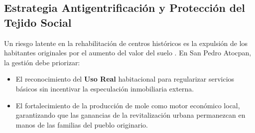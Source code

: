 \subsection{Estrategia Antigentrificación y Protección del Tejido Social}
\label{ssec:estrategia-proteccion-tejido-social}

Un riesgo latente en la rehabilitación de centros históricos es la expulsión 
de los habitantes originales por el aumento del valor 
del suelo \cite{balandrano2016conservacion}. En San Pedro Atocpan, 
la gestión debe priorizar:

\begin{itemize}
    \item El reconocimiento del \textbf{Uso Real} habitacional para 
            regularizar servicios básicos sin incentivar la especulación 
            inmobiliaria externa.
    \item El fortalecimiento de la producción de mole como motor económico 
            local, garantizando que las ganancias de la revitalización urbana 
            permanezcan en manos de las familias del pueblo originario.
\end{itemize}